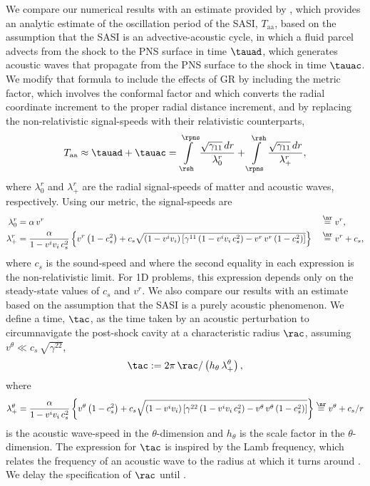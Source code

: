 We compare our numerical results with an estimate provided by
\citet{m2020}, which
provides an analytic estimate of the oscillation period
of the SASI, $T_{\mathrm{aa}}$,
based on the assumption that the SASI is an advective-acoustic cycle,
in which a fluid parcel advects from the shock to the PNS surface in time
$\tauad$, which generates acoustic waves that propagate from the
PNS surface to the shock in time $\tauac$.
We modify that formula to include the effects of GR
by including the metric factor, which involves the conformal factor
and which converts the radial coordinate increment to the proper radial
distance increment,
and by replacing the non-relativistic signal-speeds with their relativistic
counterparts,
\begin{equation}
  T_{\mathrm{aa}}\approx\tauad+\tauac
  =\int\limits_{\rsh}^{\rpns}\frac{\sqrt{\gamma_{11}}\,dr}{\lambda^{r}_{0}}
  +\int\limits_{\rpns}^{\rsh}\frac{\sqrt{\gamma_{11}}\,dr}{\lambda^{r}_{+}},
  \label{eq.MullerEst}
\end{equation}
where $\lambda^{r}_{0}$ and $\lambda^{r}_{+}$ are the radial signal-speeds of
matter and acoustic waves, respectively.
Using our metric, the signal-speeds are \citep{rz2013}
\begin{alignat}{2}
  \lambda^{r}_{0}&=\alpha\,v^{r}&&\stackrel{\nr}{=}v^{r},\label{eq.lambda0}\\
  \lambda^{r}_{+}&=\frac{\alpha}{1-v^{i}v_{i}\,c_{s}^{2}}
  \left\{v^{r}\left(1-c_{s}^{2}\right)
  +c_{s}\sqrt{\left(1-v^{i}v_{i}\right)
  \left[\gamma^{11}\left(1-v^{i}v_{i}\,c_{s}^{2}\right)
  -v^{r}\,v^{r}\left(1-c_{s}^{2}\right)\right]}\right\}
  &&\stackrel{\nr}{=}v^{r}+c_{s},\label{eq.lambda+}
\end{alignat}
where $c_{s}$ is the sound-speed
and where the second equality in each expression is the non-relativistic limit.
For 1D problems,
this expression depends only on the steady-state values of $c_{s}$ and $v^{r}$.
We also compare our results with an estimate based on the assumption that
the SASI is a purely acoustic phenomenon.
We define a time, $\tac$, as the time taken by an
acoustic perturbation
to circumnavigate the post-shock cavity
at a characteristic radius $\rac$,
assuming $v^{\theta}\ll c_{s}\,\sqrt{\gamma^{22}}$,
\begin{equation}
  \tac
  :=2\pi\,\rac/\left(h_{\theta}\,\lambda_{+}^{\theta}\right),
  \label{eq.Tac}
\end{equation}
where
\begin{equation}
  \lambda^{\theta}_{+}=\frac{\alpha}{1-v^{i}v_{i}\,c_{s}^{2}}
  \left\{v^{\theta}\left(1-c_{s}^{2}\right)
  +c_{s}\sqrt{\left(1-v^{i}v_{i}\right)
  \left[\gamma^{22}\left(1-v^{i}v_{i}\,c_{s}^{2}\right)
  -v^{\theta}\,v^{\theta}\left(1-c_{s}^{2}\right)\right]}\right\}
  \stackrel{\nr}{=}v^{\theta}+c_{s}/r
\end{equation}
is the acoustic wave-speed in the $\theta$-dimension \citep{rz2013} and
$h_{\theta}$ is the scale factor in the $\theta$-dimension.
The expression for $\tac$ is inspired by the Lamb frequency,
which relates the frequency of an acoustic wave to the radius at which it turns
around \citep{hkt2004}.
We delay the specification of $\rac$ until .

